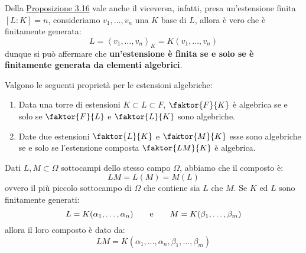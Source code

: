 \documentclass[11pt]{scrartcl}
\begin{document}
\pagebreak
\begin{remark}
    Della \hyperref[3.16]{Proposizione 3.16} vale anche il viceversa, infatti, presa un'estensione finita $[L:K] = n$, consideriamo $v_1,\ldots,v_n$ una $K$ base di $L$, allora 
    è vero che è finitamente generata:
    \[ L = \left<v_1,\ldots,v_n\right>_K = K(v_1,\ldots,v_n)
        \]
    dunque si può affermare che \textbf{un'estensione è finita se e solo se è finitamente generata da elementi algebrici}.
\end{remark}

\begin{proposition}
    Valgono le seguenti proprietà per le estensioni algebriche:
    \begin{enumerate}[(1)]
        \item Data una torre di estensioni $K \subset L \subset F$, $\faktor{F}{K}$ è algebrica se e solo se $\faktor{F}{L}$ e $\faktor{L}{K}$ sono algebriche.
        \item Date due estensioni $\faktor{L}{K}$ e $\faktor{M}{K}$ esse sono algebriche se e solo se l'estensione composta $\faktor{LM}{K}$ è algebrica.
    \end{enumerate}
\end{proposition}

\begin{remark}
    Dati $L,M \subset \Omega$ sottocampi dello stesso campo $\Omega$, abbiamo che il composto è:
    \[ LM = L(M) = M(L)
        \]
    ovvero il più piccolo sottocampo di $\Omega$ che contiene sia $L$ che $M$. Se $K$ ed $L$ sono finitamente generati:
    \[ L = K(\alpha_1,\ldots,\alpha_n) \qquad \text e \qquad M = K(\beta_1,\ldots,\beta_m)
        \]
    allora il loro composto è dato da:
    \[ LM = K(\alpha_1,\ldots,\alpha_n,\beta_1,\ldots,\beta_m)
        \]
\end{remark}
\end{document}
